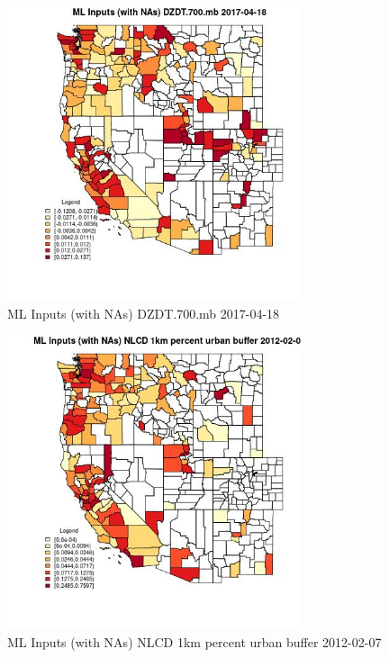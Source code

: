\begin{figure} 
\centering  
\includegraphics[width=0.77\textwidth]{Code_Outputs/Report_ML_input_PM25_Step4_part_f_de_duplicated_aveswNAs_CountyDZDT700mbMean2017-04-18.jpg} 
\caption{\label{fig:Report_ML_input_PM25_Step4_part_f_de_duplicated_aveswNAsCountyDZDT700mbMean2017-04-18}ML Inputs (with NAs) DZDT.700.mb 2017-04-18} 
\end{figure} 
 

\clearpage 

\begin{figure} 
\centering  
\includegraphics[width=0.77\textwidth]{Code_Outputs/Report_ML_input_PM25_Step4_part_f_de_duplicated_aveswNAs_CountyNLCD_1km_percent_urban_bufferMean2012-02-07.jpg} 
\caption{\label{fig:Report_ML_input_PM25_Step4_part_f_de_duplicated_aveswNAsCountyNLCD_1km_percent_urban_bufferMean2012-02-07}ML Inputs (with NAs) NLCD 1km percent urban buffer 2012-02-07} 
\end{figure} 
 

